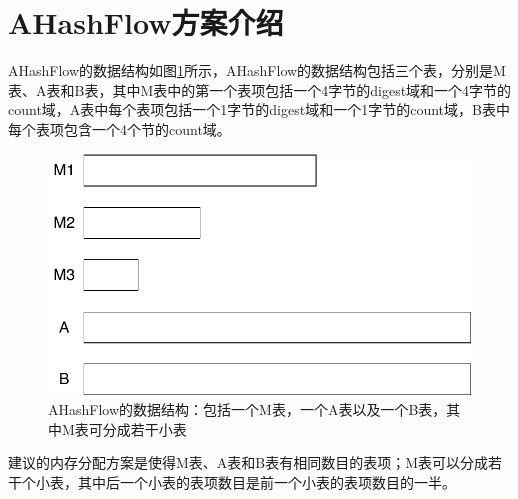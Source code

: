 \documentclass{article}
\begin{document}
\section{AHashFlow方案介绍}
AHashFlow的数据结构如图\ref{fig:ahashflow}所示，AHashFlow的数据结构包括三个表，分别是M表、A表和B表，其中M表中的第一个表项包括一个4字节的digest域和一个4字节的count域，A表中每个表项包括一个1字节的digest域和一个1字节的count域，B表中每个表项包含一个4个节的count域。
\begin{figure}[ht!]
	\centering
	\includegraphics[width=0.7\linewidth]{./figures/AHashFlowDataStructure/AHashFlow}
	\caption{AHashFlow的数据结构：包括一个M表，一个A表以及一个B表，其中M表可分成若干小表}
	\label{fig:ahashflow}
\end{figure}

建议的内存分配方案是使得M表、A表和B表有相同数目的表项；M表可以分成若干个小表，其中后一个小表的表项数目是前一个小表的表项数目的一半。



\begin{algorithm}[ht!]
	\caption{$promote(idx, digest, cnt)$}
	\label{alg: promote}
	\begin{algorithmic}[1]
	\end{algorithmic}
\end{algorithm}

\begin{algorithm}[ht!]
	\caption{$reset(idx)$}
	\label{alg: reset}
	\begin{algorithmic}[1]
	\end{algorithmic}
\end{algorithm}
\end{document}

